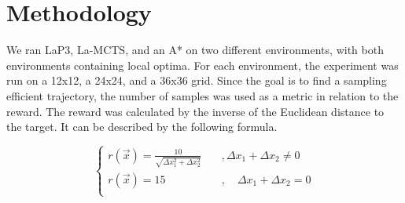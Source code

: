 \documentclass[bibliography=totoc]{scrartcl}
\begin{document}
\section{Methodology}
We ran \ac{LaP3}, \ac{La-MCTS}, and an A* on two different environments, with both environments containing local optima.
For each environment, the experiment was run on a 12x12, a 24x24, and a 36x36 grid.
Since the goal is to find a sampling efficient trajectory, the number of samples was used as a metric in relation to the reward.
The reward was calculated by the inverse of the Euclidean distance to the target. It can be described by the following formula.

\begin{equation}
\left\{
\begin{array}{lll}
 r(\vec{x})=\frac{10}{\sqrt{\Delta x_1 ^2+\Delta x_2 ^2}}\quad&, \Delta x_1 + \Delta x_2 \neq 0\\
r(\vec{x})=15 &,\quad \Delta x_1 + \Delta x_2 =0\\
\end{array}
\right.
\end{equation}
\end{document}
